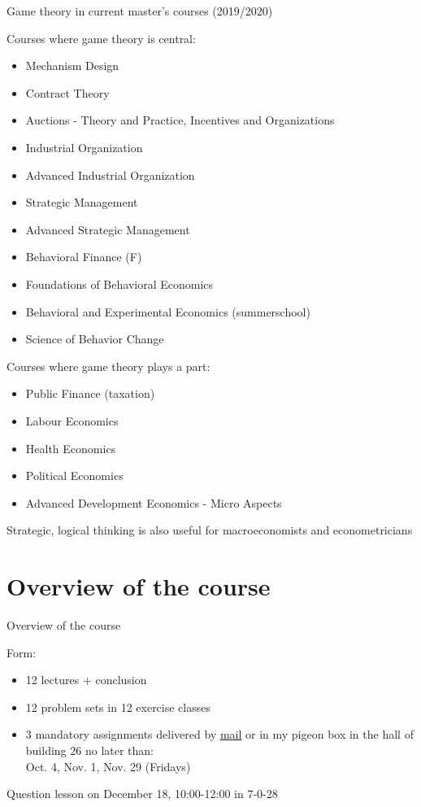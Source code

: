 \begin{frame}{Game theory in current master's courses (2019/2020)}
\begin{multicols}{2}
Courses where game theory is central:
\begin{itemize}
  \item Mechanism Design \item Contract Theory \item Auctions - Theory  and Practice, Incentives and Organizations \item Industrial Organization \item Advanced Industrial Organization  \item Strategic Management \item Advanced Strategic Management \item Behavioral Finance (F) \item Foundations of Behavioral Economics \item Behavioral and Experimental Economics (summerschool) \item Science of Behavior Change
\end{itemize}
\columnbreak
Courses where game theory plays a part:
\begin{itemize}
  \item Public Finance (taxation) \item Labour Economics \item Health Economics \item Political Economics \item Advanced Development Economics - Micro Aspects
\end{itemize}
Strategic, logical thinking is also useful for macroeconomists and econometricians
\end{multicols}
\end{frame}


\section{Overview of the course}

\begin{frame}{Overview of the course}
\begin{multicols}{2}
Form:
  \begin{itemize}
    \item 12 lectures + conclusion
    \item 12 problem sets in 12 exercise classes
    \item 3 mandatory assignments delivered by \href{mailto:thor.noe@econ.ku.dk}{mail} or in my pigeon box in the hall of building 26 no later than: \\
    Oct. 4, Nov. 1, Nov. 29 (Fridays)
  \end{itemize}
Question lesson on December 18, 10:00-12:00 in 7-0-28
\columnbreak
\vfill\null
\end{multicols}
\end{frame}

